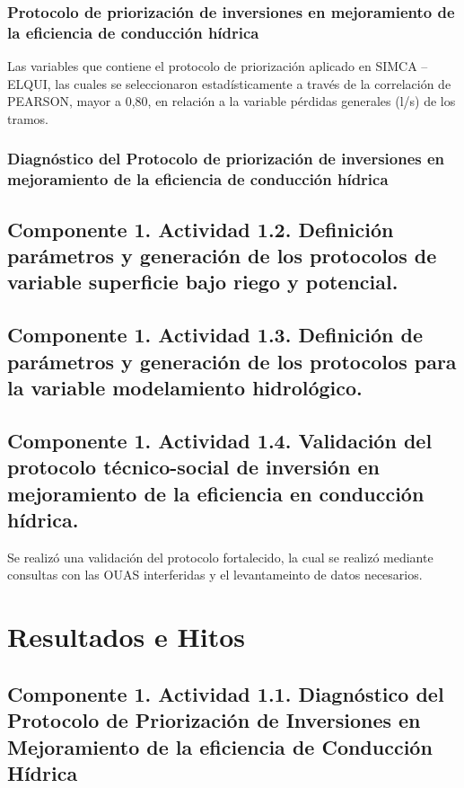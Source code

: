 \documentclass[]{article}
\begin{document}
\subsubsection{Protocolo de priorización de inversiones en mejoramiento de la eficiencia de conducción hídrica}

Las variables que contiene el protocolo de priorización aplicado en SIMCA – ELQUI, las cuales se seleccionaron estadísticamente a través de la correlación de PEARSON, mayor a 0,80, en relación a la variable pérdidas generales (l/s) de los tramos.

\subsubsection{Diagnóstico del Protocolo de priorización de inversiones en mejoramiento de la eficiencia de conducción hídrica}



\subsection{Componente 1. Actividad 1.2. Definición parámetros y generación de los protocolos de variable superficie bajo riego y potencial.}




\subsection{Componente 1. Actividad 1.3. Definición de parámetros y generación de los protocolos para la variable modelamiento hidrológico.}


\subsection{Componente 1. Actividad 1.4. Validación del protocolo técnico-social de inversión en mejoramiento de la eficiencia en conducción hídrica.}

Se realizó una validación del protocolo fortalecido, la cual se realizó mediante consultas con las OUAS interferidas y el levantameinto de datos necesarios.


\clearpage
\section{Resultados e Hitos}

\subsection{Componente 1. Actividad 1.1. Diagnóstico del Protocolo de Priorización de Inversiones en Mejoramiento de la eficiencia de Conducción Hídrica}
\end{document}
